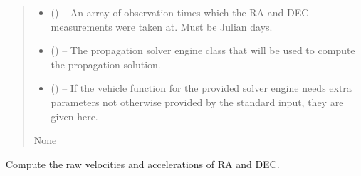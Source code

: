\documentclass[letterpaper,11pt,english]{sphinxmanual}
\begin{document}
\begin{savenotes}
\begin{fulllineitems}
\begin{savenotes}
\begin{fulllineitems}
\begin{quote}
\begin{description}
\begin{itemize}
\item {} 
\sphinxAtStartPar
{} () – An array of observation times which the RA and DEC measurements
were taken at. Must be Julian days.

\item {} 
\sphinxAtStartPar
{} ({\hyperref[\detokenize{code/opihiexarata.library.engine:opihiexarata.library.engine.PropagationEngine}]{}}) – The propagation solver engine class that will be used to compute
the propagation solution.

\item {} 
\sphinxAtStartPar
{} () – If the vehicle function for the provided solver engine needs
extra parameters not otherwise provided by the standard input,
they are given here.

\end{itemize}

\sphinxAtStartPar
None

\end{description}\end{quote}

\end{fulllineitems}\end{savenotes}


\begin{savenotes}\begin{fulllineitems}
\label{\detokenize{code/opihiexarata.propagate.solution:opihiexarata.propagate.solution.PropagativeSolution.__init_compute_propagation_motion}}
\pysigstartsignatures
{}
\pysigstopsignatures
\sphinxAtStartPar
Compute the raw velocities and accelerations of RA and DEC.


\end{fulllineitems}
\end{savenotes}
\end{fulllineitems}
\end{savenotes}
\end{document}
